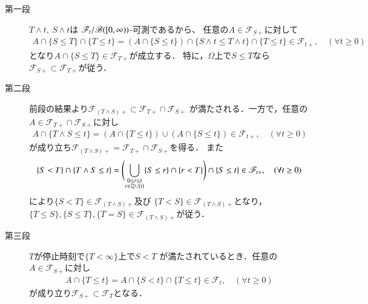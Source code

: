 	\begin{prf}\mbox{}
		\begin{description}
			\item[第一段]
				$T \wedge t,\ S \wedge t$は
				$\mathscr{F}_t/\mathscr{B}([0,\infty))$-可測であるから、
				任意の$A \in \mathscr{F}_{S+}$に対して
				\begin{align}
					A \cap \{S \leq T\} \cap \{T \leq t\}
					= (A \cap \{S \leq t\}) \cap \{S \wedge t \leq T \wedge t\} \cap \{T \leq t\}
					\in \mathscr{F}_{t+},
					\quad (\forall t \geq 0)
				\end{align}
				となり$A \cap \{S \leq T\} \in \mathscr{F}_{T+}$が成立する．
				特に，$\Omega$上で$S \leq T$なら$\mathscr{F}_{S+} \subset \mathscr{F}_{T+}$が従う．
				
			\item[第二段]
				前段の結果より$\mathscr{F}_{(T \wedge S)+} \subset \mathscr{F}_{T+} \cap \mathscr{F}_{S+}$
				が満たされる．一方で，任意の$A \in \mathscr{F}_{T+} \cap \mathscr{F}_{S+}$に対し
				\begin{align}
					A \cap \{T \wedge S \leq t\}
					= \left( A \cap \{T \leq t\} \right) \cup \left( A \cap \{S \leq t\} \right)
					\in \mathscr{F}_{t+},
					\quad (\forall t \geq 0)
				\end{align}
				が成り立ち$\mathscr{F}_{(T \wedge S)+} = \mathscr{F}_{T+} \cap \mathscr{F}_{S+}$を得る．
				また
				\begin{align}
					\{S < T\} \cap \{T \wedge S \leq t\}
					= \Biggl( \bigcup_{\substack{0 \leq r \leq t \\ r \in \mathbb{Q} \cup \{t\}}} \{S \leq r\} \cap \{r < T\} \Biggr) 
					\cap \{S \leq t\}
					\in \mathscr{F}_{t+},
					\quad (\forall t \geq 0)
				\end{align}
				により$\{S < T\} \in \mathscr{F}_{(T \wedge S)+}$及び
				$\{T < S\} \in \mathscr{F}_{(T \wedge S)+}$となり，
				$\{T \leq S\},\{S \leq T\},\{T = S\} \in \mathscr{F}_{(T \wedge S)+}$が従う．
			
			\item[第三段]
				$T$が停止時刻で$\{T < \infty\}$上で$S < T$
				が満たされているとき．任意の$A \in \mathscr{F}_{S+}$に対し
				\begin{align}
					A \cap \{T \leq t\}
					= A \cap \{S < t\} \cap \{T \leq t\}
					\in \mathscr{F}_t,
					\quad (\forall t \geq 0)
				\end{align}
				が成り立り$\mathscr{F}_{S+} \subset \mathscr{F}_T$となる．
				\QED
		\end{description}
	\end{prf}
	
